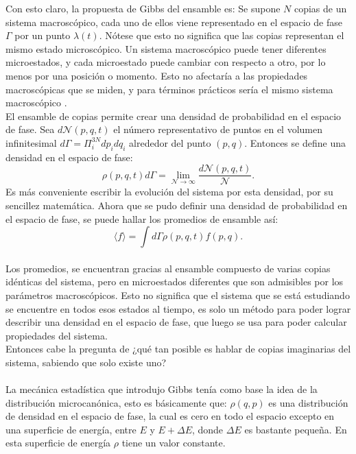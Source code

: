 Con esto claro, la propuesta de Gibbs del ensamble es: Se supone $N$ copias de un sistema macroscópico, cada uno de ellos viene representado en el espacio de fase $\Gamma$ por un punto $\lambda(t)$. Nótese que esto no significa  que las copias representan el mismo estado microscópico. Un sistema macroscópico puede tener diferentes microestados, y cada microestado puede cambiar con respecto a otro, por lo menos por una posición o momento. Esto no afectaría a las propiedades macroscópicas que se miden, y para términos prácticos sería el mismo sistema macroscópico \cite{KardarStat}.
\\
El ensamble de copias permite crear una densidad de probabilidad en el espacio de fase. Sea $d\mathcal{N}(p,q,t)$ el número representativo de puntos en el volumen infinitesimal $d\Gamma = \Pi^{3N}_{i}dp_{i}dq_{i}$ alrededor del punto $(p,q)$. Entonces se define una densidad en el espacio de fase:
\begin{equation}
\rho(p,q,t)d\Gamma= \lim_{\mathcal{N} \to \infty} \frac{d\mathcal{N}(p,q,t)}{\mathcal{N}}.
\end{equation}
Es más conveniente escribir la evolución del sistema por esta densidad, por su sencillez matemática. 
Ahora que se pudo definir una densidad de probabilidad en el espacio de fase, se puede hallar los promedios de ensamble así:
\begin{equation}
\langle f \rangle = \int d\Gamma \rho(p,q,t) f(p,q).
\end{equation}
\\
Los promedios, se encuentran gracias al ensamble compuesto de varias copias idénticas del sistema, pero en microestados diferentes que son admisibles por los parámetros macroscópicos. Esto no significa que el sistema que se está estudiando se encuentre en todos esos estados al tiempo, es solo un método para poder lograr describir una densidad en el espacio de fase, que luego se usa para poder calcular propiedades del sistema.\\
Entonces cabe la pregunta de ¿qué tan posible es hablar de copias imaginarias del sistema, sabiendo que solo existe uno?
\\
\\
La mecánica estadística que introdujo Gibbs tenía como base la idea de la distribución microcanónica, esto es básicamente que: $\rho(q,p)$ es una distribución de densidad en el espacio de fase, la cual es cero en todo el espacio excepto en una superficie de energía, entre $E$ y $E+ \Delta E$, donde $\Delta E$ es bastante pequeña. En esta superficie de energía $\rho$ tiene un valor constante.
